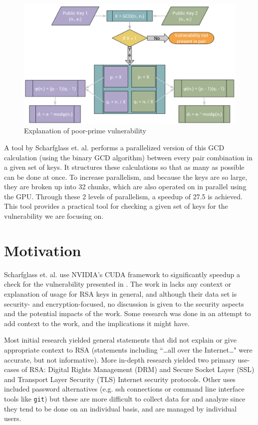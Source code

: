 \documentclass[12pt]{ucthesis}
\begin{document}
\begin{figure}
   \label{fig:vuln}
   \centering
   \includegraphics[width=\linewidth]{vulnerability.png}
   \caption{Explanation of poor-prime vulnerability}
\end{figure}

A tool by Scharfglass et. al. \cite{scharfglass2012breaking} performs a
parallelized version of this GCD calculation (using the binary GCD algorithm)
between every pair combination in a given set of keys. It structures these
calculations so that as many as possible can be done at once. To increase
parallelism, and because the keys are so large, they are broken up into 32
chunks, which are also operated on in parallel using the GPU. Through these 2
levels of parallelism, a speedup of 27.5 is achieved. This tool provides a
practical tool for checking a given set of keys for the vulnerability we are
focusing on.

\section{Motivation}
Scharfglass et. al. use NVIDIA's CUDA framework to significantly speedup a
check for the vulnerability
presented in \cite{lenstra2012ron}. The work in \cite{scharfglass2012breaking}
lacks any context or explanation of usage for RSA keys in general, and although
their data set is security- and encryption-focused, no discussion is given to
the security aspects and the potential impacts of the work. Some research was
done in an attempt to add context to the work, and the implications it might
have.

Most initial research yielded general statements that did not explain or give
appropriate context to RSA (statements including ``\dots all over the
Internet\dots" were accurate, but not informative). More in-depth research
yielded two primary use-cases of RSA: Digital Rights Management (DRM) and
Secure Socket Layer (SSL) and Transport Layer Security (TLS) Internet
security protocols. Other uses included password alternatives (e.g. ssh
connections or command line interface tools like \texttt{git}) but these are
more difficult to collect data for and analyze since they tend to be done on
an individual basis, and are managed by individual users.
\end{document}
